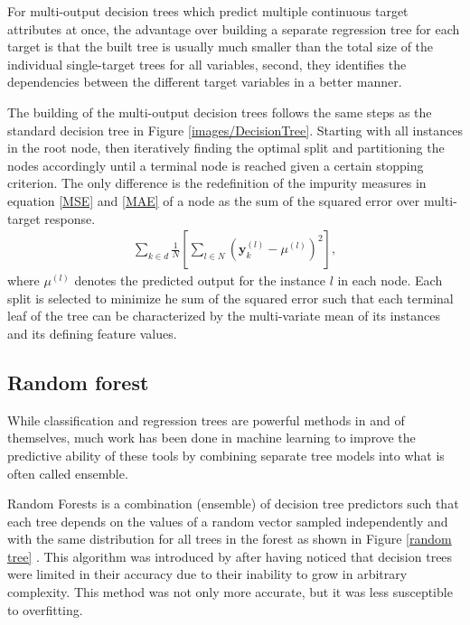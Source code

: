 For multi-output decision trees which predict multiple continuous target attributes at once, the advantage over building a separate
regression tree for each target is that the built tree is usually much smaller than the total size of the individual single-target trees for all variables, second, they identifies the dependencies between the different target variables in a better manner.

The building of the multi-output decision trees follows  the same steps as the standard decision tree in Figure \ref{images/DecisionTree}. Starting with all instances in the root node, then iteratively finding the optimal split and partitioning the nodes accordingly until a terminal node is reached given a certain stopping criterion. The only difference  is the redefinition of the impurity measures in equation \ref{MSE} and \ref{MAE} of a node as the sum of the squared error  over multi-target response. 
\begin{align}
\sum_{k\in d}\frac{1}{N}\left[\sum_{l \in N }\left(\textbf{y}_{k}^{(l)}-\mu^{(l)} \right)^2\right],
\end{align}
where $\mu^{(l)}$ denotes the predicted output for the instance $l$ in each node. Each split is selected to minimize he sum of the squared error such that each terminal leaf of the tree can be characterized by the multi-variate mean
of its instances and its defining feature values.

\subsection{Random forest}
While classification and regression trees are powerful methods in and of themselves, much work has been done in machine learning to improve the predictive ability of these tools by combining separate tree models into what is often called ensemble.

Random Forests is a combination (ensemble) of decision tree predictors such that each tree depends on the values of a random vector sampled independently and with the same distribution for all trees in the forest as shown in Figure \ref{random tree} \citep{breiman2001random}. This algorithm  was introduced by \citep{ho1995random} after having noticed that decision trees were limited in their accuracy due to their inability to grow in arbitrary complexity. This method was not only more accurate, but it was less susceptible to overfitting.

